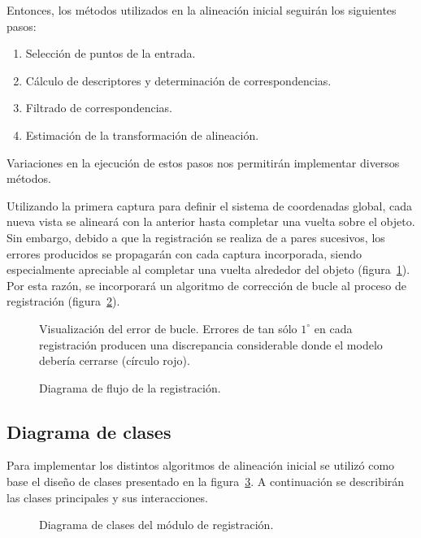 	Entonces, los métodos utilizados en la alineación inicial seguirán los siguientes pasos:
	\begin{enumerate}
		\item Selección de puntos de la entrada.
		\item Cálculo de descriptores y determinación de correspondencias.
		\item Filtrado de correspondencias.
		\item Estimación de la transformación de alineación.
	\end{enumerate}
	Variaciones en la ejecución de estos pasos nos permitirán implementar diversos métodos.


	Utilizando la primera captura para definir el sistema de coordenadas
	global, cada nueva vista se alineará con la anterior hasta completar una
	vuelta sobre el objeto.  Sin embargo, debido a que la registración se
	realiza de a pares sucesivos, los errores producidos se propagarán con cada
	captura incorporada, siendo especialmente apreciable al completar una
	vuelta alrededor del objeto (figura~\ref{fig:error_bucle}).
	Por esta razón, se incorporará un algoritmo de corrección de bucle al proceso de registración
	(figura~\ref{fig:flow_registracion}).

	\begin{figure}
		\caption{\label{fig:error_bucle}Visualización del error de bucle. Errores de tan sólo $1^{\circ}$
		en cada registración producen una discrepancia considerable
		donde el modelo debería cerrarse (círculo rojo).}
	\end{figure}

	\begin{figure}
		\caption{\label{fig:flow_registracion}Diagrama de flujo de la registración.}
	\end{figure}

	\subsection{Diagrama de clases}
		Para implementar los distintos algoritmos de alineación inicial se utilizó como base
		el diseño de clases presentado en la figura~\ref{fig:align_class}.
		A continuación se describirán las clases principales y sus interacciones.
		\begin{figure}
			\caption{\label{fig:align_class}Diagrama de clases del módulo de registración.}
		\end{figure}

